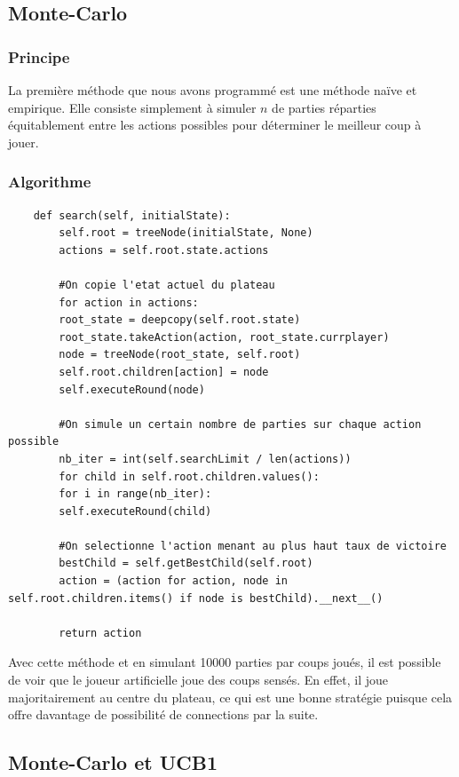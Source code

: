 \documentclass[a4paper]{article}
\theoremstyle{definition}
\begin{document}
\subsection{Monte-Carlo}

\subsubsection{Principe}

La première méthode que nous avons programmé est une méthode naïve et empirique. Elle consiste simplement à simuler $n$ de parties réparties équitablement entre les actions possibles pour déterminer le meilleur coup à jouer.

\subsubsection{Algorithme}

\begin{lstlisting}
	def search(self, initialState):
		self.root = treeNode(initialState, None)
		actions = self.root.state.actions
	
		#On copie l'etat actuel du plateau
		for action in actions:
		root_state = deepcopy(self.root.state)
		root_state.takeAction(action, root_state.currplayer)
		node = treeNode(root_state, self.root)
		self.root.children[action] = node
		self.executeRound(node)
		
		#On simule un certain nombre de parties sur chaque action possible
		nb_iter = int(self.searchLimit / len(actions))
		for child in self.root.children.values():
		for i in range(nb_iter):
		self.executeRound(child)
		
		#On selectionne l'action menant au plus haut taux de victoire
		bestChild = self.getBestChild(self.root)
		action = (action for action, node in self.root.children.items() if node is bestChild).__next__()
		
		return action
\end{lstlisting}

Avec cette méthode et en simulant 10000 parties par coups joués, il est possible de voir que le joueur artificielle joue des coups sensés. En effet, il joue majoritairement au centre du plateau, ce qui est une bonne stratégie puisque cela offre davantage de possibilité de connections par la suite.

\newpage 


\subsection{Monte-Carlo et UCB1}
\end{document}
